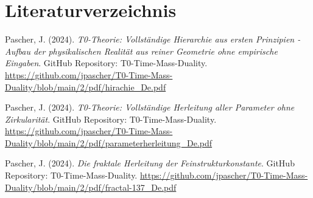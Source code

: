 \documentclass[12pt,a4paper]{article}
\begin{document}
	\section{Literaturverzeichnis}
	
	\begin{thebibliography}{99}
		
		Pascher, J. (2024). \textit{T0-Theorie: Vollständige Hierarchie aus ersten Prinzipien - Aufbau der physikalischen Realität aus reiner Geometrie ohne empirische Eingaben}. 
		GitHub Repository: T0-Time-Mass-Duality.
		\url{https://github.com/jpascher/T0-Time-Mass-Duality/blob/main/2/pdf/hirachie_De.pdf}
		
		Pascher, J. (2024). \textit{T0-Theorie: Vollständige Herleitung aller Parameter ohne Zirkularität}. 
		GitHub Repository: T0-Time-Mass-Duality.
		\url{https://github.com/jpascher/T0-Time-Mass-Duality/blob/main/2/pdf/parameterherleitung_De.pdf}
		
		Pascher, J. (2024). \textit{Die fraktale Herleitung der Feinstrukturkonstante}. 
		GitHub Repository: T0-Time-Mass-Duality.
		\url{https://github.com/jpascher/T0-Time-Mass-Duality/blob/main/2/pdf/fractal-137_De.pdf}
		
	\end{thebibliography}
	
\end{document}
